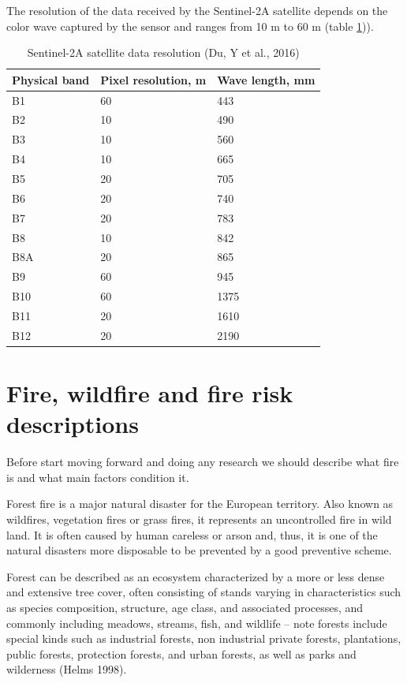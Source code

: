 {{	The resolution of the data received by the Sentinel-2A satellite depends on the color wave captured by the sensor and ranges from 10 m to 60 m (table \ref{tab:sent-res})).
	
	{\setlength{\extrarowheight}{15pt}%
	\begin{table}[H]
		\begin{center}
			\caption{Sentinel-2A satellite data resolution (Du, Y et al., 2016)}
			\label{tab:sent-res}
			\begin{tabularx}{\textwidth}{|X|X|X|}
				\hline
				\textbf{Physical band} & \textbf{Pixel resolution, m} & \textbf{Wave length, mm}\\
				\hline
				B1 & 60 & 443 \\
				\hline
				B2 & 10 & 490 \\
				\hline
				B3 & 10 & 560 \\
				\hline
				B4 & 10 & 665 \\
				\hline
				B5 & 20 & 705 \\
				\hline
				B6 & 20 & 740 \\
				\hline
				B7 & 20 & 783 \\
				\hline
				B8 & 10 & 842 \\
				\hline
				B8A & 20 & 865 \\
				\hline
				B9 & 60 & 945 \\
				\hline
				B10 & 60 & 1375 \\
				\hline
				B11 & 20 & 1610 \\
				\hline
				B12 & 20 & 2190 \\
				\hline
			\end{tabularx}
		\end{center}
	\end{table}
		
\section{Fire, wildfire and fire risk descriptions}
	Before start moving forward and doing any research we should describe what fire is and what main factors condition it.
	
	Forest fire is a major natural disaster for the European territory. Also known as wildfires, vegetation fires or grass fires, it represents an uncontrolled fire in wild land. It is often caused by human careless or arson and, thus, it is one of the natural disasters more disposable to be prevented by a good preventive scheme.
	
	Forest can be described as an ecosystem characterized by a more or less dense and extensive tree cover, often consisting of stands varying in characteristics such as species composition, structure, age class, and associated processes, and commonly including meadows, streams, fish, and wildlife – note forests include special kinds such as industrial forests, non industrial private forests, plantations, public forests, protection forests, and urban forests, as well as parks and wilderness (Helms 1998).
	
}}}
